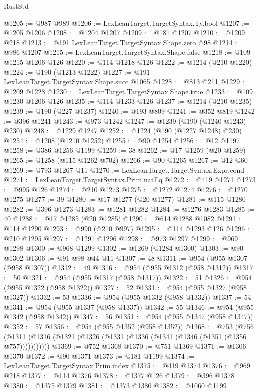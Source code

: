 \begin{lexlean}{RustStd}
\begin{coremodule}
@1205 := @987 @989
@1206 := LexLeanTarget.TargetSyntax.Ty.bool
@1207 := @1205 @1206
@1208 := @1204 @1207
@1209 := @181 @1207
@1210 := @1209 @218
@1213 := @191 LexLeanTarget.TargetSyntax.Shape.zero @98
@1214 := @986 @1207
@1215 := LexLeanTarget.TargetSyntax.Shape.false
@1218 := @109 @1215 @1206 @126
@1220 := @114 @1218 @126
@1222 := @1214 (@210 @1220)
@1224 := @190 (@1213 @1222)
@1227 := @191 LexLeanTarget.TargetSyntax.Shape.succ @1065
@1228 := @813 @211
@1229 := @1209 @1228
@1230 := LexLeanTarget.TargetSyntax.Shape.true
@1233 := @109 @1230 @1206 @126
@1235 := @114 @1233 @126
@1237 := @1214 (@210 @1235)
@1239 := @190 (@227 @1237)
@1240 := @193 @809
@1241 := @352 @819
@1242 := @396 @1241
@1243 := @973 @1242
@1247 := @1239 (@190 (@1240 @1243) @230)
@1248 := @1229 @1247
@1252 := @1224 (@190 (@1227 @1248) @230)
@1254 := @1208 (@1210 @1252)
@1255 := @90 @1254
@1256 := @12 @1197
@1258 := @386 @1256 @1199
@1259 := 38
@1262 := @17 @1259 (@20 @1259)
@1265 := @1258 (@115 @1262 @702)
@1266 := @90 @1265
@1267 := @12 @60
@1269 := @793 @1267 @11
@1270 := LexLeanTarget.TargetSyntax.Expr.cond
@1271 := LexLeanTarget.TargetSyntax.Prim.natEq
@1272 := @419 @1271
@1273 := @995 @126
@1274 := @210 @1273
@1275 := @1272 @1274
@1276 := @1270 @1275
@1277 := 39
@1280 := @17 @1277 (@20 @1277)
@1281 := @115 @1280
@1282 := @396 @1273
@1283 := @1281 @1282
@1284 := @1276 @1283
@1285 := 40
@1288 := @17 @1285 (@20 @1285)
@1290 := @614 @1288 @1082
@1291 := @114 @1290
@1293 := @990 (@210 @997)
@1295 := @114 @1293 @126
@1296 := @210 @1295
@1297 := @1291 @1296
@1298 := @973 @1297
@1299 := @969 @1298
@1300 := @968 @1299
@1302 := @1269 (@1284 @1300)
@1303 := @90 @1302
@1306 := @91 @98 @44 @11
@1307 := 48
@1311 := @954 (@955 @1307 (@958 @1307))
@1312 := 49
@1316 := @954 (@955 @1312 (@958 @1312))
@1317 := 50
@1321 := @954 (@955 @1317 (@958 @1317))
@1322 := 51
@1326 := @954 (@955 @1322 (@958 @1322))
@1327 := 52
@1331 := @954 (@955 @1327 (@958 @1327))
@1332 := 53
@1336 := @954 (@955 @1332 (@958 @1332))
@1337 := 54
@1341 := @954 (@955 @1337 (@958 @1337))
@1342 := 55
@1346 := @954 (@955 @1342 (@958 @1342))
@1347 := 56
@1351 := @954 (@955 @1347 (@958 @1347))
@1352 := 57
@1356 := @954 (@955 @1352 (@958 @1352))
@1368 := @753
    (@756 (@1311 (@1316 (@1321 (@1326 (@1331 (@1336 (@1341 (@1346 (@1351 (@1356 @757)))))))))))
@1369 := @752 @1368
@1370 := @751 @1369
@1371 := @1306 @1370
@1372 := @90 @1371
@1373 := @181 @1199
@1374 := LexLeanTarget.TargetSyntax.Prim.index
@1375 := @419 @1374
@1376 := @969 @218
@1377 := @114 @1376
@1378 := @1377 @126
@1379 := @396 @1378
@1380 := @1375 @1379
@1381 := @1373 @1380
@1382 := @1060 @1199

\end{coremodule}
\end{lexlean}
